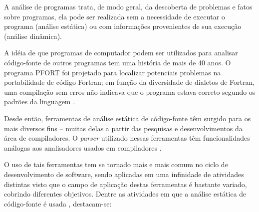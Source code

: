 A análise de programas trata, de modo geral, da descoberta de problemas e
fatos sobre programas, ela pode ser realizada sem a necessidade de executar o
programa (análise estática) ou com informações provenientes de sua execução
(análise dinâmica).

A idéia de que programas de computador podem ser utilizados para analisar
código-fonte de outros programas tem uma história de mais de 40 anos.  O
programa PFORT \cite{Ryder1974} foi projetado para localizar potenciais
problemas na portabilidade de código Fortran; em função da diversidade de
dialetos de Fortran, uma compilação sem erros não indicava que o programa
estava correto segundo os padrões da linguagem \cite{Wichmann1995}.

Desde então, ferramentas de análise estática de código-fonte têm surgido para
os mais diversos fins -- muitas delas a partir das pesquisas e
desenvolvimentos da área de compiladores.  O {\it parser} utilizado nessas
ferramentas têm funcionalidades análogas aos analisadores usados em
compiladores \cite{Anderson2008}.

O uso de tais ferramentas tem se
tornado mais e mais comum no ciclo de desenvolvimento de
software, sendo aplicadas em uma infinidade de atividades distintas visto que o
campo de aplicação destas ferramentas é bastante variado, cobrindo diferentes
objetivos. Dentre as atividades em que a análise estática de código-fonte é
usada \cite{Chess2007}, destacam-se:

